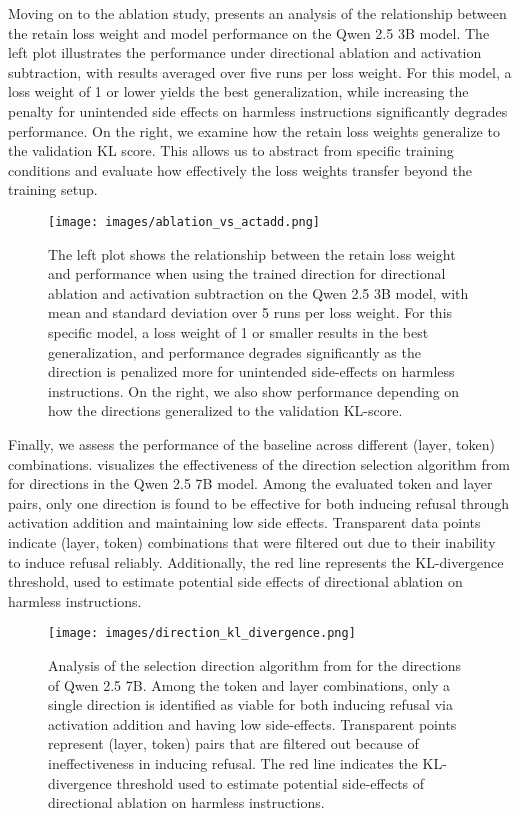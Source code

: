 Moving on to the ablation study,  presents an analysis of the relationship between the retain loss weight and model performance on the Qwen 2.5 3B model. The left plot illustrates the performance under directional ablation and activation subtraction, with results averaged over five runs per loss weight. For this model, a loss weight of 1 or lower yields the best generalization, while increasing the penalty for unintended side effects on harmless instructions significantly degrades performance. On the right, we examine how the retain loss weights generalize to the validation KL score. This allows us to abstract from specific training conditions and evaluate how effectively the loss weights transfer beyond the training setup.
\begin{figure}
    \centering
    \texttt{[image: images/ablation\_vs\_actadd.png]}
    \caption{The left plot shows the relationship between the retain loss weight and performance when using the trained direction for directional ablation and activation subtraction on the Qwen 2.5 3B model, with mean and standard deviation over 5 runs per loss weight. For this specific model, a loss weight of 1 or smaller results in the best generalization, and performance degrades significantly as the direction is penalized more for unintended side-effects on harmless instructions. On the right, we also show performance depending on how the directions generalized to the validation KL-score.}
    \label{fig:kl_ablation}
\end{figure}

Finally, we assess the performance of the baseline across different (layer, token) combinations.  visualizes the effectiveness of the direction selection algorithm from \citet{arditi2024refusallanguagemodelsmediated} for \dimacro directions in the Qwen 2.5 7B model. Among the evaluated token and layer pairs, only one direction is found to be effective for both inducing refusal through activation addition and maintaining low side effects. Transparent data points indicate (layer, token) combinations that were filtered out due to their inability to induce refusal reliably. Additionally, the red line represents the KL-divergence threshold, used to estimate potential side effects of directional ablation on harmless instructions.
\begin{figure}
    \centering
    \texttt{[image: images/direction\_kl\_divergence.png]}
    \caption{Analysis of the selection direction algorithm from \citet{arditi2024refusallanguagemodelsmediated} for the \dimacro directions of Qwen 2.5 7B. Among the token and layer combinations, only a single direction is identified as viable for both inducing refusal via activation addition and having low side-effects. Transparent points represent (layer, token) pairs that are filtered out because of ineffectiveness in inducing refusal. The red line indicates the KL-divergence threshold used to estimate potential side-effects of directional ablation on harmless instructions.}
    \label{fig:token_layer_combinations}
\end{figure}






